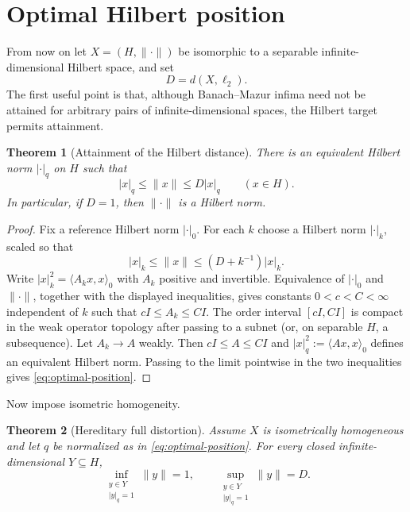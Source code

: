 \documentclass[11pt]{article}
\newtheorem{theorem}{Theorem}[section]
\theoremstyle{definition}
\begin{document}
\section{Optimal Hilbert position}\label{sec:optimal}

From now on let $X=(H,\|\cdot\|)$ be isomorphic to a separable
infinite-dimensional Hilbert space, and set
\[
 D=d(X,\ell_2).
\]
The first useful point is that, although Banach--Mazur infima need not be
attained for arbitrary pairs of infinite-dimensional spaces, the Hilbert
target permits attainment.

\begin{theorem}[Attainment of the Hilbert distance]\label{thm:attainment}
There is an equivalent Hilbert norm $|\cdot|_q$ on $H$ such that
\begin{equation}\label{eq:optimal-position}
 |x|_q\leq\|x\|\leq D|x|_q\qquad(x\in H).
\end{equation}
In particular, if $D=1$, then $\|\cdot\|$ is a Hilbert norm.
\end{theorem}

\begin{proof}
Fix a reference Hilbert norm $|\cdot|_0$.  For each $k$ choose a Hilbert norm
$|\cdot|_k$, scaled so that
\[
 |x|_k\leq\|x\|\leq(D+k^{-1})|x|_k.
\]
Write $|x|_k^2=\langle A_kx,x\rangle_0$ with $A_k$ positive and invertible.
Equivalence of $|\cdot|_0$ and $\|\cdot\|$, together with the displayed
inequalities, gives constants $0<c<C<\infty$ independent of $k$ such that
$cI\leq A_k\leq CI$.  The order interval $[cI,CI]$ is compact in the weak
operator topology after passing to a subnet (or, on separable $H$, a
subsequence).  Let $A_k\to A$ weakly.  Then $cI\leq A\leq CI$ and
$|x|_q^2:=\langle Ax,x\rangle_0$ defines an equivalent Hilbert norm.  Passing
to the limit pointwise in the two inequalities gives
\eqref{eq:optimal-position}.
\end{proof}

Now impose isometric homogeneity.

\begin{theorem}[Hereditary full distortion]\label{thm:endpoints}
Assume $X$ is isometrically homogeneous and let $q$ be normalized as in
\eqref{eq:optimal-position}.  For every closed infinite-dimensional
$Y\subseteq H$,
\begin{equation}\label{eq:endpoints}
 \inf_{\substack{y\in Y\\|y|_q=1}}\|y\|=1,
 \qquad
 \sup_{\substack{y\in Y\\|y|_q=1}}\|y\|=D.
\end{equation}
\end{theorem}
\end{document}
